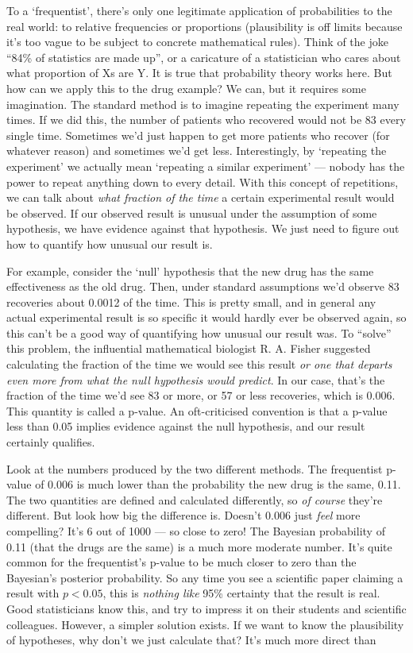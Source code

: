 \documentclass[a4paper, 12pt]{article}
\begin{document}
To a `frequentist', there's only one legitimate application of probabilities to
the real world: to relative frequencies or proportions
(plausibility is off
limits because it's too vague to be subject to concrete mathematical rules).
Think of the joke
``84\% of statistics are made up'', or a caricature of a statistician who cares
about what proportion of Xs are Y. It is true that probability theory works
here. But how can we apply this to the drug example? We can, but it requires
some imagination.
The standard method is to imagine repeating the experiment many times.
If we did this, the number of patients who recovered would
not be 83 every single time. Sometimes we'd just happen to get more patients
who recover (for whatever reason) and sometimes we'd get less. Interestingly,
by `repeating the experiment' we actually mean `repeating a similar experiment'
--- nobody has the power to repeat anything down to every detail.
With this concept of repetitions, we can talk about {\em what fraction of the
time} a certain experimental result would be observed. If our observed result
is unusual under the assumption of some hypothesis, we have evidence against
that hypothesis. We just need to figure out how to quantify how unusual our
result is.

For example, consider the `null' hypothesis that the new drug
has the same effectiveness as the old drug. Then, under standard assumptions we'd
observe 83 recoveries about 0.0012 of the time. This is pretty small, and in
general any actual experimental result is so specific it would hardly
ever be observed again, so this can't be a good way of quantifying how unusual
our result was. To ``solve'' this problem, the influential mathematical
biologist R. A. Fisher suggested calculating the fraction of the time we would
see this result {\em or one that departs even more from what the null
hypothesis would predict}. In our case, that's the fraction of the time we'd
see 83 or more, or 57 or less recoveries, which is 0.006.
This quantity is called a p-value.
An oft-criticised convention is that a p-value less than 0.05 implies evidence
against the null hypothesis, and our result certainly qualifies.

Look at the numbers produced by the two different methods. The frequentist p-value of 0.006 is much lower than the probability the new drug is the same, 0.11.
The two quantities are defined and calculated differently, so {\em of course} they're different. But look how big the difference is.
Doesn't 0.006 just {\em feel}
more compelling? It's 6 out of 1000 --- so close to zero!
The Bayesian probability of 0.11 (that the drugs are the same) is a much
more moderate number. It's quite common for the frequentist's p-value to
be much closer to zero than the Bayesian's posterior probability.
So any time you see a scientific paper claiming a result with $p < 0.05$, this
is {\em nothing like} 95\% certainty that the result is real.
Good statisticians know this, and try to impress it on their students and
scientific colleagues. However, a simpler solution exists. If we want to know
the plausibility of hypotheses, why don't we just calculate that? It's much
more direct than
\end{document}
